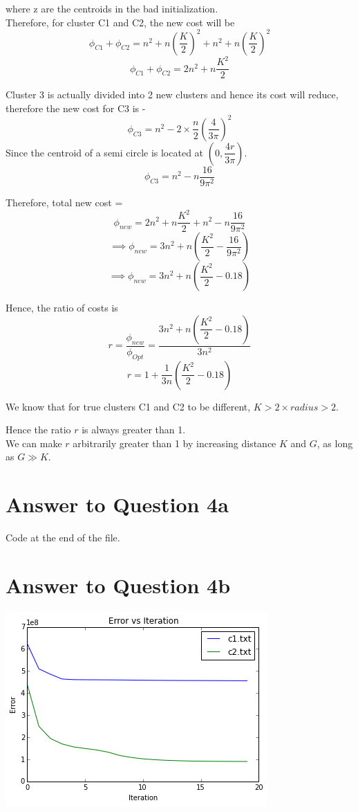 \documentclass[11pt]{article}
\begin{document}
{where z are the centroids in the bad initialization. \\

Therefore, for cluster C1 and C2, the new cost will be
$$\phi_{C1} + \phi_{C2} = n^2 + n (\dfrac{K}{2})^2 + n^2 + n (\dfrac{K}{2})^2$$
$$\phi_{C1} + \phi_{C2} = 2n^2 + n \dfrac{K^2}{2} $$

Cluster 3 is actually divided into 2 new clusters and hence its cost will reduce, therefore the new cost for C3 is -
$$\phi_{C3} = n^2 - 2 \times \frac{n}{2} (\dfrac{4}{3\pi})^2$$
Since the centroid of a semi circle is located at $(0, \dfrac{4r}{3\pi})$.
$$\phi_{C3} = n^2 - n \dfrac{16}{9 \pi^2}$$

Therefore, total new cost = 
$$\phi_{new} = 2n^2 + n \dfrac{K^2}{2} + n^2 - n \dfrac{16}{9 \pi^2} $$
$$\implies \phi_{new} = 3n^2 + n (\dfrac{K^2}{2} - \dfrac{16}{9 \pi^2})  $$
$$\implies \phi_{new} = 3n^2 + n (\dfrac{K^2}{2} - 0.18)  $$

Hence, the ratio of costs is
$$ r = \dfrac{\phi_{new}}{\phi_{Opt}} = \dfrac{3n^2 + n (\dfrac{K^2}{2} - 0.18)}{3n^2}$$
$$ r = 1 + \frac{1}{3n} (\dfrac{K^2}{2} - 0.18)$$

We know that for true clusters C1 and C2 to be different, $K > 2 \times radius > 2$.

Hence the ratio $r$ is always greater than 1.\\

We can make $r$ arbitrarily greater than 1 by increasing distance $K$ and $G$, as long as $G \gg K$.

\pagebreak[4]
\section*{Answer to Question 4a}
Code at the end of the file.

\pagebreak[4]
\section*{Answer to Question 4b}
\includegraphics*{q4err}\\

}
\end{document}
